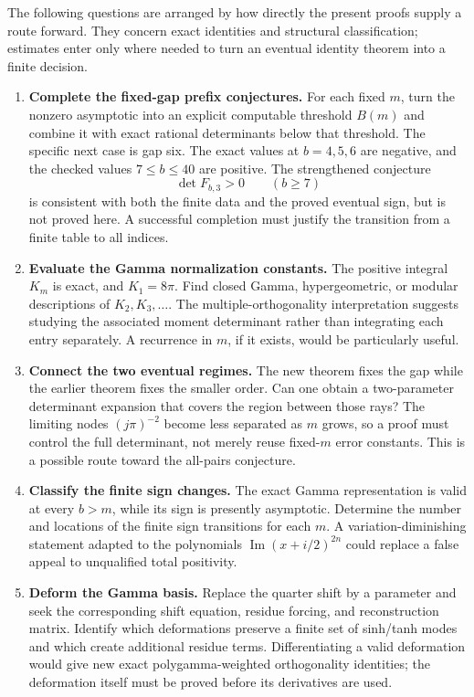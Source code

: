 \documentclass[11pt,a4paper]{article}
\numberwithin{equation}{section}
\theoremstyle{definition}
\theoremstyle{remark}
\begin{document}
The following questions are arranged by how directly the present
proofs supply a route forward. They concern exact identities and
structural classification; estimates enter only where needed to
turn an eventual identity theorem into a finite decision.

\begin{enumerate}[label=\textbf{\arabic*.},leftmargin=*]
\item \textbf{Complete the fixed-gap prefix conjectures.}
For each fixed $m$, turn the nonzero asymptotic into an explicit
computable threshold $B(m)$ and combine it with exact rational
determinants below that threshold. The specific next case is gap
six. The exact values at $b=4,5,6$ are negative, and the checked
values $7\le b\le40$ are positive. The strengthened conjecture
\[
 \det F_{b,3}>0\qquad(b\ge7)
\]
is consistent with both the finite data and the proved eventual
sign, but is not proved here. A successful completion must justify
the transition from a finite table to all indices.

\item \textbf{Evaluate the Gamma normalization constants.}
The positive integral $K_m$ is exact, and $K_1=8\pi$.
Find closed Gamma, hypergeometric, or modular descriptions of
$K_2,K_3,\ldots$. The multiple-orthogonality interpretation suggests
studying the associated moment determinant rather than integrating
each entry separately. A recurrence in $m$, if it exists, would be
particularly useful.

\item \textbf{Connect the two eventual regimes.}
The new theorem fixes the gap while the earlier theorem fixes the
smaller order. Can one obtain a two-parameter determinant expansion
that covers the region between those rays? The limiting nodes
$(j\pi)^{-2}$ become less separated as $m$ grows, so a proof must
control the full determinant, not merely reuse fixed-$m$ error
constants. This is a possible route toward the all-pairs conjecture.

\item \textbf{Classify the finite sign changes.}
The exact Gamma representation is valid at every $b>m$, while its
sign is presently asymptotic. Determine the number and locations of
the finite sign transitions for each $m$. A variation-diminishing
statement adapted to the polynomials
$\operatorname{Im}(x+i/2)^{2n}$ could replace a false appeal to
unqualified total positivity.

\item \textbf{Deform the Gamma basis.}
Replace the quarter shift by a parameter and seek the corresponding
shift equation, residue forcing, and reconstruction matrix. Identify
which deformations preserve a finite set of sinh/tanh modes and
which create additional residue terms. Differentiating a valid
deformation would give new exact polygamma-weighted orthogonality
identities; the deformation itself must be proved before its
derivatives are used.


\end{enumerate}
\end{document}
